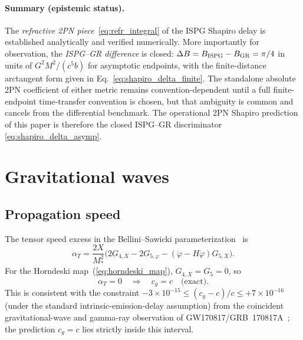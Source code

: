 \documentclass[aps,prd,onecolumn,superscriptaddress,nofootinbib,showpacs,12pt]{revtex4-2}
\begin{document}
\paragraph{Summary (epistemic status).}
The \emph{refractive 2PN piece}~\eqref{eq:refr_integral} of the
ISPG Shapiro delay is established analytically and verified
numerically.  More importantly for observation, the
\emph{ISPG--GR difference} is closed:
$\Delta B=B_{\rm ISPG}-B_{\rm GR}=\pi/4$ in units of
$G^2M^2/(c^5b)$ for asymptotic endpoints, with the
finite-distance arctangent form given in
Eq.~\eqref{eq:shapiro_delta_finite}.  The standalone absolute
2PN coefficient of either metric remains convention-dependent
until a full finite-endpoint time-transfer convention is chosen,
but that ambiguity is common and cancels from the differential
benchmark.  The operational 2PN Shapiro prediction of this
paper is therefore the closed ISPG--GR discriminator
\eqref{eq:shapiro_delta_asymp}.

\section{Gravitational waves}\label{sec:gw}

\subsection{Propagation speed}\label{sec:gw_speed}

The tensor speed excess in the Bellini--Sawicki
parameterization~\cite{BelliniSawicki2014} is
\begin{equation}\label{eq:alphaT}
  \alpha_{T} = \frac{2X}{M_{*}^{2}}
    \bigl(2G_{4,X} - 2G_{5,\varphi}
    - (\ddot{\varphi}-H\dot{\varphi})G_{5,X}\bigr).
\end{equation}
For the Horndeski map~(\ref{eq:horndeski_map}),
$G_{4,X} = G_{5} = 0$, so
\begin{equation}\label{eq:cg}
  \alpha_{T} = 0 \quad\Longrightarrow\quad c_{g} = c
  \quad\text{(exact)}.
\end{equation}
This is consistent with the constraint
$-3\times 10^{-15} \leq (c_{g} - c)/c \leq +7\times 10^{-16}$
(under the standard intrinsic-emission-delay assumption)
from the coincident gravitational-wave and gamma-ray observation
of GW170817/GRB~170817A~\cite{LIGO_GW170817}; the prediction
$c_g = c$ lies strictly inside this interval.
\end{document}

